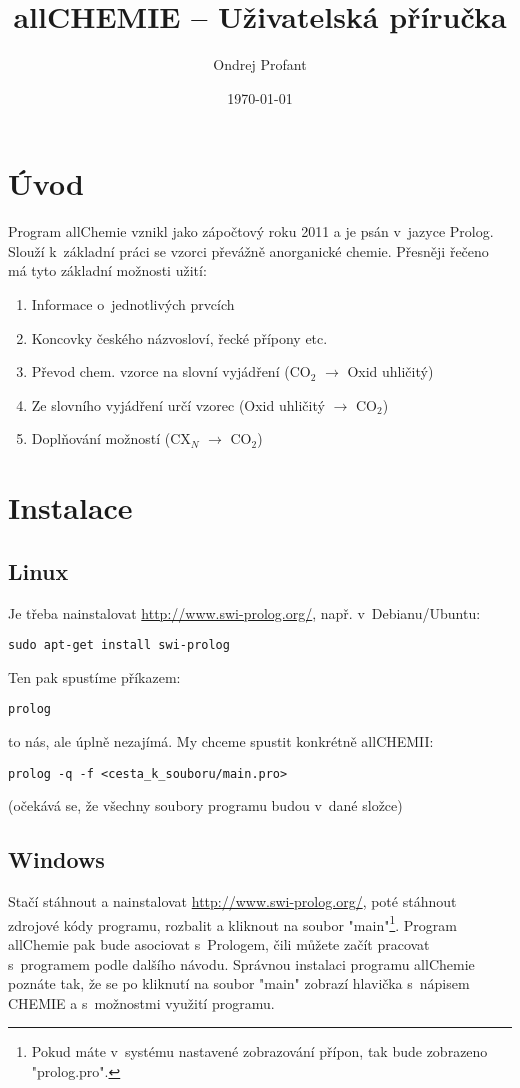 \documentclass[a4paper]{article}
\title{allCHEMIE -- Uživatelská příručka}
\author{Ondrej Profant}
\date{\today}
\begin{document}
\maketitle
\newpage
\tableofcontents
\newpage
\section{Úvod}
Program allChemie vznikl jako zápočtový roku 2011 a je psán v~jazyce Prolog. Slouží k~základní práci se vzorci převážně anorganické chemie. Přesněji řečeno má tyto základní možnosti užití:
\begin{enumerate}
\item Informace o~jednotlivých prvcích
\item Koncovky českého názvosloví, řecké přípony etc.
\item Převod chem. vzorce na slovní vyjádření (CO$_2$ $\rightarrow$ Oxid uhličitý)
\item Ze slovního vyjádření určí vzorec (Oxid uhličitý $\rightarrow$ CO$_2$)
\item Doplňování možností (CX$_N$ $\rightarrow$ CO$_2$)

\end{enumerate}
\section{Instalace} 
\subsection{Linux}
Je třeba nainstalovat \href{swi-prolog}{http://www.swi-prolog.org/}, např. v~Debianu/Ubuntu:
\begin{verbatim}
sudo apt-get install swi-prolog
\end{verbatim}
Ten pak spustíme příkazem:
\begin{verbatim}
prolog
\end{verbatim}
to nás, ale úplně nezajímá. My chceme spustit konkrétně allCHEMII:
\begin{verbatim}
prolog -q -f <cesta_k_souboru/main.pro>
\end{verbatim}
(očekává se, že všechny soubory programu budou v~dané složce)
\subsection{Windows}
Stačí stáhnout a nainstalovat \href{swi-prolog}{http://www.swi-prolog.org/}, poté stáhnout zdrojové kódy programu, rozbalit a kliknout na soubor "main"\footnote{Pokud máte v~systému nastavené zobrazování přípon, tak bude zobrazeno "prolog.pro".}. Program allChemie pak bude asociovat s~Prologem, čili můžete začít pracovat s~programem podle dalšího návodu. Správnou instalaci programu allChemie poznáte tak, že se po kliknutí na soubor "main" zobrazí hlavička s~nápisem CHEMIE a s~možnostmi využití programu.
\end{document}
